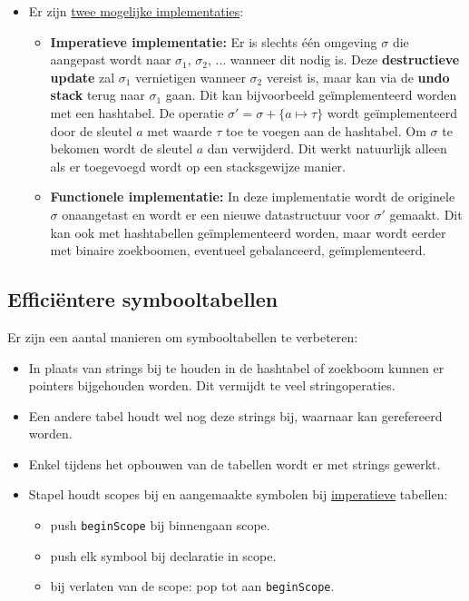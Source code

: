 \begin{itemize}
	\alert De $+$ operatie is hier niet commutatief. De precieze betekenis hangt af van de scoping regels van een taal.
	\item Er zijn \underline{twee mogelijke implementaties}:
	\begin{itemize}
		\item \textbf{Imperatieve implementatie:} Er is slechts één omgeving $\sigma$ die aangepast wordt naar $\sigma_1$, $\sigma_2$, ... wanneer dit nodig is. Deze \textbf{destructieve update} zal $\sigma_1$ vernietigen wanneer $\sigma_2$ vereist is, maar kan via de \textbf{undo stack} terug naar $\sigma_1$ gaan. Dit kan bijvoorbeeld geïmplementeerd worden met een hashtabel. De operatie $\sigma' = \sigma + \{a \mapsto \tau \}$ wordt geïmplementeerd door de sleutel $a$ met waarde $\tau$ toe te voegen aan de hashtabel. Om $\sigma$ te bekomen wordt de sleutel $a$ dan verwijderd. Dit werkt natuurlijk alleen als er toegevoegd wordt op een stacksgewijze manier.
		\item \textbf{Functionele implementatie:} In deze implementatie wordt de originele $\sigma$ onaangetast en wordt er een nieuwe datastructuur voor $\sigma'$ gemaakt. Dit kan ook met hashtabellen geïmplementeerd worden, maar wordt eerder met binaire zoekboomen, eventueel gebalanceerd, geïmplementeerd.
	\end{itemize}
\end{itemize}

\subsection{Efficiëntere symbooltabellen}
Er zijn een aantal manieren om symbooltabellen te verbeteren:
\begin{itemize}
	\item In plaats van strings bij te houden in de hashtabel of zoekboom kunnen er pointers bijgehouden worden. Dit vermijdt te veel stringoperaties.
	\item Een andere tabel houdt wel nog deze strings bij, waarnaar kan gerefereerd worden.
	\item Enkel tijdens het opbouwen van de tabellen wordt er met strings gewerkt.
	\item Stapel houdt scopes bij en aangemaakte symbolen bij \underline{imperatieve} tabellen:
	\begin{itemize}
		\item push \texttt{beginScope} bij binnengaan scope.
		\item push elk symbool bij declaratie in scope.
		\item bij verlaten van de scope: pop tot aan \texttt{beginScope}.
	\end{itemize}
\end{itemize}



